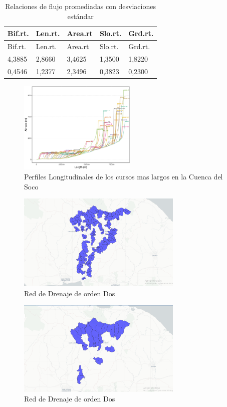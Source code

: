 \documentclass[11pt,]{article}
\begin{document}
\begin{longtable}[]{@{}lllll@{}}
\caption{\label{tablatres}Relaciones de flujo promediadas con
desviaciones estándar}\tabularnewline
\toprule
Bif.rt. & Len.rt. & Area.rt & Slo.rt. & Grd.rt.\tabularnewline
\midrule
\endfirsthead
\toprule
Bif.rt. & Len.rt. & Area.rt & Slo.rt. & Grd.rt.\tabularnewline
\midrule
\endhead
4,3885 & 2,8660 & 3,4625 & 1,3500 & 1,8220\tabularnewline
0,4546 & 1,2377 & 2,3496 & 0,3823 & 0,2300\tabularnewline
\bottomrule
\end{longtable}

\begin{figure}
\centering
\includegraphics[width=0.50000\textwidth]{perf mas largo.png}
\caption{Perfiles Longitudinales de los cursos mas largos en la Cuenca
del Soco\label{mapauno}}
\end{figure}

\begin{figure}
\centering
\includegraphics[width=0.70000\textwidth]{cu drena or dos.png}
\caption{Red de Drenaje de orden Dos\label{mapatres}}
\end{figure}

\begin{figure}
\centering
\includegraphics[width=0.70000\textwidth]{cu drena or tres.png}
\caption{Red de Drenaje de orden Dos\label{mapacinco}}
\end{figure}
\end{document}
